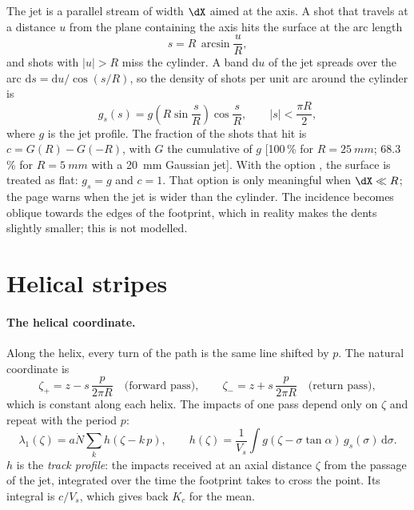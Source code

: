 \documentclass[11pt,a4paper]{article}
\begin{document}
The jet is a parallel stream of width $\dX$ aimed at the axis. A shot that travels at a distance $u$ from the plane containing the axis hits the surface at the arc length
\begin{equation}
s=R\,\arcsin\frac{u}{R},
\end{equation}
and shots with $|u|>R$ miss the cylinder. A band $\mathrm{d}u$ of the jet spreads over the arc $\mathrm{d}s=\mathrm{d}u/\cos(s/R)$, so the density of shots per unit arc around the cylinder is
\begin{equation}
g_s(s)=g\!\left(R\sin\frac{s}{R}\right)\cos\frac{s}{R},\qquad |s|<\frac{\pi R}{2},
\end{equation}
where $g$ is the jet profile. The fraction of the shots that hit is $c=G(R)-G(-R)$, with $G$ the cumulative of $g$ [100\,\% for $R=\SI{25}{mm}$; 68.3\,\% for $R=\SI{5}{mm}$ with a \SI{20}{mm} Gaussian jet]. With the option , the surface is treated as flat: $g_s=g$ and $c=1$. That option is only meaningful when $\dX\ll R$; the page warns when the jet is wider than the cylinder. The incidence becomes oblique towards the edges of the footprint, which in reality makes the dents slightly smaller; this is not modelled.

\section{Helical stripes}

\paragraph{The helical coordinate.} Along the helix, every turn of the path is the same line shifted by $p$. The natural coordinate is
\begin{equation}
\zeta_+=z-s\,\frac{p}{2\pi R}\quad\text{(forward pass)},\qquad \zeta_-=z+s\,\frac{p}{2\pi R}\quad\text{(return pass)},
\end{equation}
which is constant along each helix. The impacts of one pass depend only on $\zeta$ and repeat with the period $p$:
\begin{equation}
\lambda_1(\zeta)=a\dot N\sum_k h(\zeta-k\,p),\qquad
h(\zeta)=\frac{1}{V_s}\int g(\zeta-\sigma\tan\alpha)\,g_s(\sigma)\,\mathrm{d}\sigma.
\label{eq:h}
\end{equation}
$h$ is the \emph{track profile}: the impacts received at an axial distance $\zeta$ from the passage of the jet, integrated over the time the footprint takes to cross the point. Its integral is $c/V_s$, which gives back $K_c$ for the mean.
\end{document}
